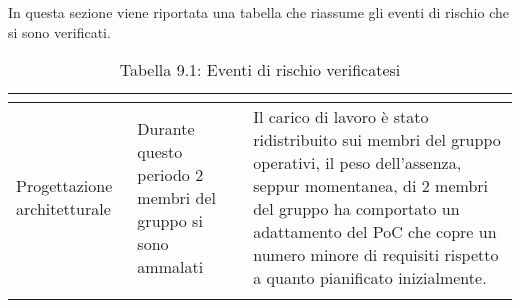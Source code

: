 In questa sezione viene riportata una tabella che riassume gli eventi di rischio che si sono verificati.
\\
\renewcommand{\arraystretch}{1.5}
\begin{longtable}{| m{13em} | m{11em} | m{14em} |}
\hline
\rowcolor{title_row}
\textbf{\color{title_text}{Periodo}}  & \textbf{\color{title_text}{Evento}} & \textbf{\color{title_text}{Reazione}} \\
\endhead
\hline
Progettazione architetturale & Durante questo periodo 2 membri del gruppo si sono ammalati & Il carico di lavoro è stato ridistribuito sui membri del gruppo operativi,
il peso dell'assenza, seppur momentanea, di 2 membri del gruppo ha comportato un adattamento del PoC che copre un numero minore di requisiti rispetto a quanto pianificato inizialmente. \\
\hline
\caption{Tabella 9.1: Eventi di rischio verificatesi\label{}}
\end{longtable}
\renewcommand{\arraystretch}{1}
\newpage
